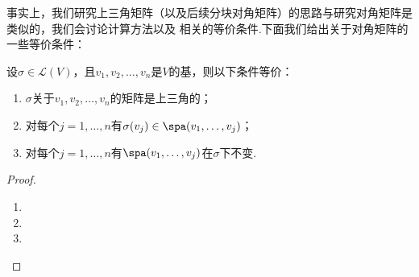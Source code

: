 事实上，我们研究上三角矩阵（以及后续分块对角矩阵）的思路与研究对角矩阵是类似的，我们会讨论计算方法以及
相关的等价条件.下面我们给出关于对角矩阵的一些等价条件：
\begin{theorem}\label{thm:19:上三角矩阵等价条件}
    设$\sigma\in \mathcal{L}(V)$，且$v_1,v_2,\ldots,v_n$是$V$的基，则以下条件等价：
    \begin{enumerate}
        \item $\sigma$关于$v_1,v_2,\ldots,v_n$的矩阵是上三角的；

        \item 对每个$j=1,\ldots,n$有$\sigma(v_j)\in\spa(v_1,\ldots,v_j)$；

        \item 对每个$j=1,\ldots,n$有$\spa(v_1,\ldots,v_j)$在$\sigma$下不变.
    \end{enumerate}
\end{theorem}
\begin{proof}
    \begin{enumerate}
        \item 
        \item 
        \item 
    \end{enumerate}
\end{proof}

